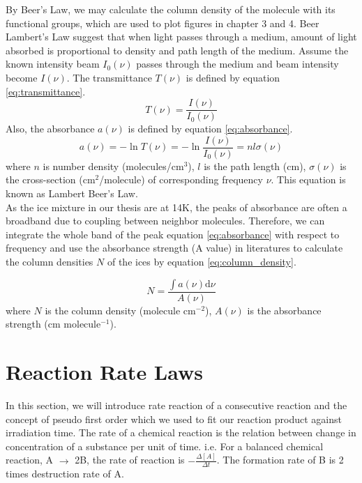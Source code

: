 By Beer’s Law, we may calculate the column density of the molecule with its functional groups, which are used to plot figures in chapter 3 and 4. Beer Lambert’s Law suggest that when light passes through a medium, amount of light absorbed is proportional to density and path length of the medium. Assume the known intensity beam $I_{0}(\nu)$ passes through the medium and beam intensity become $I(\nu)$. The transmittance $T(\nu)$ is defined by equation \ref{eq:transmittance}. \\
\begin{equation}
T(\nu) = \frac{I(\nu)}{I_{0}(\nu)}
\label{eq:transmittance}
\end{equation}
Also, the absorbance $a(\nu)$ is defined by equation \ref{eq:absorbance}. \\
\begin{equation}
a(\nu) = - \ln T(\nu) = - \ln \frac{I(\nu)}{I_{0}(\nu)} = n l \sigma(\nu)
\label{eq:absorbance}
\end{equation}
where $n$ is number density (molecules/cm$^3$), $l$ is the path length (cm), $\sigma(\nu)$ is the cross-section (cm$^2$/molecule) of corresponding frequency $\nu$. This equation is known as Lambert Beer’s Law. \\

As the ice mixture in our thesis are at 14K, the peaks of absorbance are often a broadband due to coupling between neighbor molecules. Therefore, we can integrate the whole band of the peak equation \ref{eq:absorbance} with respect to frequency and use the absorbance strength (A value) in literatures to calculate the column densities $N$ of the ices by equation \ref{eq:column_density}.

\begin{equation}
N = \frac{\int a(\nu) \mathrm{d}\nu}{A(\nu)}
\label{eq:column_density}
\end{equation}
where $N$ is the column density (molecule cm$^{-2}$), $A(\nu)$ is the absorbance strength (cm molecule$^{-1}$).

\section{Reaction Rate Laws}
\label{sec:Reaction_Rate_Laws}
In this section, we will introduce rate reaction of a consecutive reaction and the concept of pseudo first order which we used to fit our reaction product against irradiation time. The rate of a chemical reaction is the relation between change in concentration of a substance per unit of time. i.e. For a balanced chemical reaction, A $\rightarrow$ 2B, the rate of reaction is $- \frac{\Delta [A]}{\Delta t}$. The formation rate of B is 2 times destruction rate of A.

